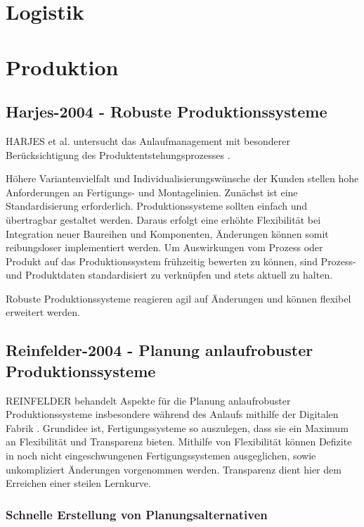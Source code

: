 \section{Logistik}

\section{Produktion}

\subsection*{Harjes-2004 - Robuste Produktionssysteme}
HARJES et al. untersucht das Anlaufmanagement mit besonderer Berücksichtigung des Produktentstehungsprozesses \cite{Harjes2004}. 

Höhere Variantenvielfalt und Individualisierungswünsche der Kunden stellen hohe Anforderungen an Fertigungs- und Montagelinien. Zunächst ist eine Standardisierung erforderlich. Produktionssysteme sollten einfach und übertragbar gestaltet werden. Daraus erfolgt eine erhöhte Flexibilität bei Integration neuer Baureihen und Komponenten, Änderungen können somit reibungsloser implementiert werden. Um Auswirkungen vom Prozess oder Produkt auf das Produktionssystem frühzeitig bewerten zu können, sind Prozess- und Produktdaten standardisiert zu verknüpfen und stets aktuell zu halten. 

Robuste Produktionssysteme reagieren agil auf Änderungen und können flexibel erweitert werden. 

\subsection*{Reinfelder-2004 - Planung anlaufrobuster Produktionssysteme}

REINFELDER behandelt Aspekte für die Planung anlaufrobuster Produktionssysteme insbesondere während des Anlaufs mithilfe der Digitalen Fabrik \cite{Reinfelder2004}. 
Grundidee ist, Fertigungssysteme so auszulegen, dass sie ein Maximum an Flexibilität und Transparenz bieten. Mithilfe von Flexibilität können Defizite in noch nicht eingeschwungenen Fertigungssystemen ausgeglichen, sowie unkompliziert Änderungen vorgenommen werden. Transparenz dient hier dem Erreichen einer steilen Lernkurve. 

\subsubsection{Schnelle Erstellung von Planungsalternativen}


